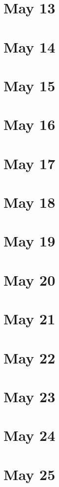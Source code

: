 \section{May 13}

\section{May 14}

\section{May 15}

\section{May 16}

\section{May 17}

\section{May 18}

\section{May 19}

\section{May 20}

\section{May 21}

\section{May 22}

\section{May 23}

\section{May 24}

\section{May 25}

